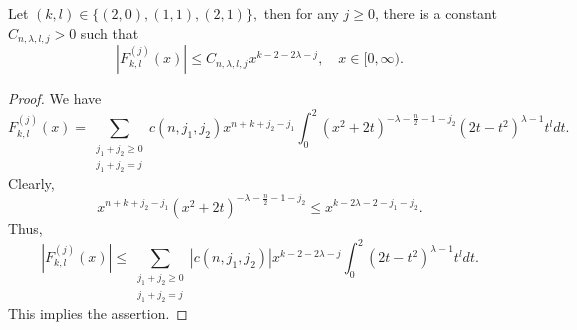 \documentclass[12pt]{amsart}
\begin{document}
\begin{lemma}\label{fourth fkl lemma} Let $(k,l)\in\{(2,0),(1,1),(2,1)\},$ then for any $j\geq0$, there is a constant $C_{n,\lambda,l,j}>0$ such that
$$|F_{k,l}^{(j)}(x)|\leq C_{n,\lambda,l,j}x^{k-2-2\lambda-j},\quad x\in [0,\infty).$$
\end{lemma}
\begin{proof} We have
$$F_{k,l}^{(j)}(x)=\sum_{\substack{j_1+j_2\geq0\\ j_1+j_2=j}}c(n,j_1,j_2)x^{n+k+j_2-j_1}\int_0^2(x^2+2t)^{-\lambda-\frac{n}{2}-1-j_2}(2t-t^2)^{\lambda-1}t^ldt.$$
Clearly,
$$x^{n+k+j_2-j_1}(x^2+2t)^{-\lambda-\frac{n}{2}-1-j_2}\leq x^{k-2\lambda-2-j_1-j_2}.$$
Thus,
$$|F_{k,l}^{(j)}(x)|\leq\sum_{\substack{j_1+j_2\geq0\\ j_1+j_2=j}}|c(n,j_1,j_2)|x^{k-2-2\lambda-j}\int_0^2(2t-t^2)^{\lambda-1}t^ldt.$$
This implies the assertion.
\end{proof}
\end{document}
